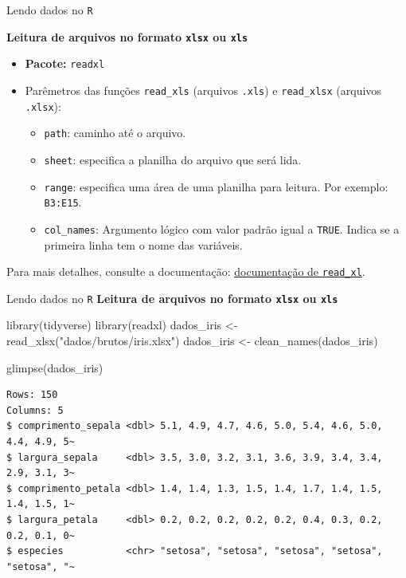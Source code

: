 \documentclass[
  10pt,
  ignorenonframetext,
]{beamer}
\newenvironment{Shaded}{\begin{snugshade}}{\end{snugshade}}
\newcommand{\FunctionTok}[1]{\textcolor[rgb]{0.28,0.35,0.67}{#1}}
\newcommand{\NormalTok}[1]{\textcolor[rgb]{0.00,0.23,0.31}{#1}}
\newcommand{\OtherTok}[1]{\textcolor[rgb]{0.00,0.23,0.31}{#1}}
\newcommand{\StringTok}[1]{\textcolor[rgb]{0.13,0.47,0.30}{#1}}
\providecommand{\tightlist}{%
  \setlength{\itemsep}{0pt}\setlength{\parskip}{0pt}}\usepackage{longtable,booktabs,array}
\begin{document}
\begin{frame}[fragile]{Lendo dados no \texttt{R}}
\protect\hypertarget{lendo-dados-no-r}{}
\normalsize

\textbf{Leitura de arquivos no formato \texttt{xlsx} ou \texttt{xls}}

\begin{itemize}
\tightlist
\item
  \textbf{Pacote:} \texttt{readxl}
\item
  Parêmetros das funções \texttt{read\_xls} (arquivos \texttt{.xls}) e
  \texttt{read\_xlsx} (arquivos \texttt{.xlsx}):

  \begin{itemize}
  \tightlist
  \item
    \texttt{path}: caminho até o arquivo.
  \item
    \texttt{sheet}: especifica a planilha do arquivo que será lida.
  \item
    \texttt{range}: especifica uma área de uma planilha para leitura.
    Por exemplo: \texttt{B3:E15}.
  \item
    \texttt{col\_names}: Argumento lógico com valor padrão igual a
    \texttt{TRUE}. Indica se a primeira linha tem o nome das variáveis.
  \end{itemize}
\end{itemize}

Para mais detalhes, consulte a documentação:
\href{https://readxl.tidyverse.org}{documentação de \texttt{read\_xl}}.
\end{frame}

\begin{frame}[fragile]{Lendo dados no \texttt{R}}
\protect\hypertarget{lendo-dados-no-r-1}{}
\textbf{Leitura de arquivos no formato \texttt{xlsx} ou \texttt{xls}}

\small

\begin{Shaded}
\begin{Highlighting}[]
\FunctionTok{library}\NormalTok{(tidyverse)}
\FunctionTok{library}\NormalTok{(readxl)}
\NormalTok{dados\_iris }\OtherTok{\textless{}{-}} \FunctionTok{read\_xlsx}\NormalTok{(}\StringTok{"dados/brutos/iris.xlsx"}\NormalTok{)}
\NormalTok{dados\_iris }\OtherTok{\textless{}{-}} \FunctionTok{clean\_names}\NormalTok{(dados\_iris)}

\FunctionTok{glimpse}\NormalTok{(dados\_iris)}
\end{Highlighting}
\end{Shaded}

\begin{verbatim}
Rows: 150
Columns: 5
$ comprimento_sepala <dbl> 5.1, 4.9, 4.7, 4.6, 5.0, 5.4, 4.6, 5.0, 4.4, 4.9, 5~
$ largura_sepala     <dbl> 3.5, 3.0, 3.2, 3.1, 3.6, 3.9, 3.4, 3.4, 2.9, 3.1, 3~
$ comprimento_petala <dbl> 1.4, 1.4, 1.3, 1.5, 1.4, 1.7, 1.4, 1.5, 1.4, 1.5, 1~
$ largura_petala     <dbl> 0.2, 0.2, 0.2, 0.2, 0.2, 0.4, 0.3, 0.2, 0.2, 0.1, 0~
$ especies           <chr> "setosa", "setosa", "setosa", "setosa", "setosa", "~
\end{verbatim}

\normalsize
\end{frame}
\end{document}

